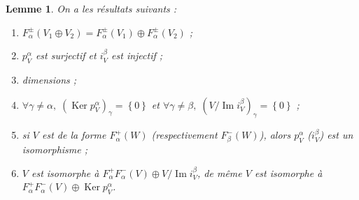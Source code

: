 \documentclass[a4paper,10pt]{article}
\newtheorem{lm}{Lemme}[section]
\DeclareMathOperator{\Ker}{Ker}
\DeclareMathOperator{\Img}{Im}
\begin{document}
\begin{lm}
	On a les résultats suivants :
	\begin{enumerate}
		\item $F_{\alpha}^{\pm}(V_{1}\oplus V_{2})=F_{\alpha}^{\pm}(V_{1})\oplus F_{\alpha}^{\pm}(V_{2})$ ;
		\item $p_{V}^{\alpha}$ est surjectif et $i_{V}^{\beta}$ est injectif ;
		\item dimensions ;
		\item $\forall \gamma\neq\alpha,\;(\Ker p_{V}^{\alpha})_{\gamma}=\left\{ 0 \right\}$ et $\forall \gamma\neq\beta,\;(V/\Img i_{V}^{\beta})_{\gamma}=\left\{ 0 \right\}$ ;
		\item si $V$ est de la forme $F_{\alpha}^{+}(W)$ (respectivement $F_{\beta}^{-}(W)$), alors $p_{V}^{\alpha}$ ($i_{V}^{\beta}$) est un isomorphisme ;
		\item $V$ est isomorphe à $F_{\alpha}^{+}F_{\alpha}^{-}(V)\oplus V/\Img i_{V}^{\beta}$, de même $V$ est isomorphe à $F_{\alpha}^{+}F_{\alpha}^{-}(V)\oplus \Ker p_{V}^{\alpha}$.
	\end{enumerate}
\end{lm}

\clearpage


\end{document}
